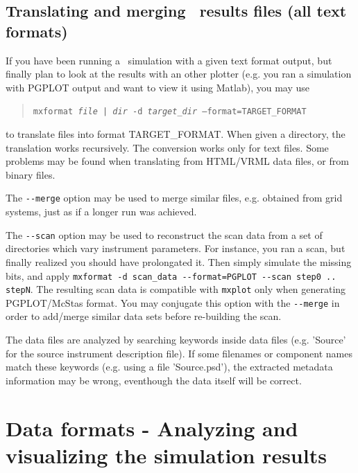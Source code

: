 \subsection{Translating and merging \MCX\ results files (all text formats)}
\label{s:mxformat}
    

If you have been running a \MCX\ simulation with a given text format output, but finally plan to look at the results with an other plotter (e.g. you ran a simulation with PGPLOT output and want to view it using Matlab), you may use
\begin{quote}
  \texttt{mxformat {\it file | dir} -d {\it target\_dir} --format=TARGET\_FORMAT}
\end{quote}
to translate files into format TARGET\_FORMAT. When given a directory, the translation works recursively. The conversion works only for text files. Some problems may be found when translating from HTML/VRML data files, or from binary files.

The \verb+--merge+ option may be used to merge similar files, e.g. obtained from grid systems, just as if a longer run was achieved.

The \verb+--scan+ option may be used to reconstruct the scan data from a set of directories which vary instrument parameters. For instance, you ran a scan, but finally realized you should have prolongated it. Then simply simulate the missing bits, and apply \verb+mxformat -d scan_data --format=PGPLOT --scan step0 .. stepN+. The resulting scan data is compatible with \verb+mxplot+ only when generating PGPLOT/McStas format. You may conjugate this option with the \verb+--merge+ in order to add/merge similar data sets before re-building the scan.

The data files are analyzed by searching keywords inside data files (e.g. 'Source' for the source instrument description file). If some filenames or component names match these keywords (e.g. using a file 'Source.psd'), the extracted metadata information may be wrong, eventhough the data itself will be correct.

\section{Data formats - Analyzing and visualizing the simulation results}
\label{s:analyze}

